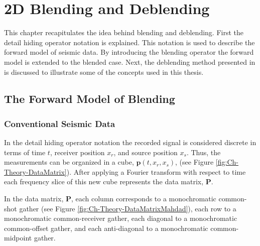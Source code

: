 \chapter{2D Blending and Deblending} \label{chap:theory}

This chapter recapitulates the idea behind blending and deblending. First the detail hiding operator notation is explained. This notation is used to describe the forward model of seismic data. By introducing the blending operator the forward model is extended to the blended case. Next, the deblending method presented in \citet{Mahdad-Deblending-Method} is discussed to illustrate some of the concepts used in this thesis.

\section{The Forward Model of Blending} \label{sec:Ch-Theory-Operator}

\subsection{Conventional Seismic Data}
In the detail hiding operator notation \citep{Berkhout1982} the recorded signal is considered discrete in terms of time $t$, receiver position $x_r$, and source position $x_s$. Thus, the measurements can be organized in a cube, $\mathbf{p}(t,x_r,x_s)$, (see Figure \ref{fig:Ch-Theory-DataMatrix}). After applying a Fourier transform with respect to time each frequency slice of this new cube represents the data matrix, $\mathbf{P}$.

In the data matrix, $\mathbf{P}$, each column corresponds to a monochromatic common-shot gather (see Figure \ref{fig:Ch-Theory-DataMatrixMahdad}), each row to a monochromatic common-receiver gather, each diagonal to a monochromatic common-offset gather, and each anti-diagonal to a monochromatic common-midpoint gather. 

